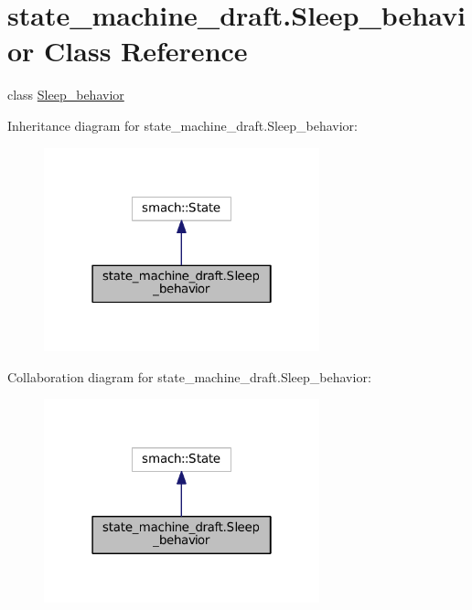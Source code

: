 \hypertarget{classstate__machine__draft_1_1Sleep__behavior}{}\section{state\+\_\+machine\+\_\+draft.\+Sleep\+\_\+behavior Class Reference}
\label{classstate__machine__draft_1_1Sleep__behavior}


class \hyperlink{classstate__machine__draft_1_1Sleep__behavior}{Sleep\+\_\+behavior}  




Inheritance diagram for state\+\_\+machine\+\_\+draft.\+Sleep\+\_\+behavior\+:
\nopagebreak
\begin{figure}[H]
\begin{center}
\leavevmode
\includegraphics[width=226pt]{classstate__machine__draft_1_1Sleep__behavior__inherit__graph}
\end{center}
\end{figure}


Collaboration diagram for state\+\_\+machine\+\_\+draft.\+Sleep\+\_\+behavior\+:
\nopagebreak
\begin{figure}[H]
\begin{center}
\leavevmode
\includegraphics[width=226pt]{classstate__machine__draft_1_1Sleep__behavior__coll__graph}
\end{center}
\end{figure}
